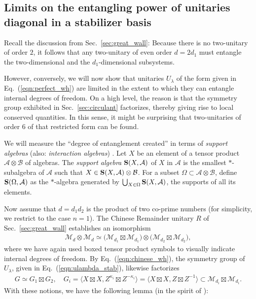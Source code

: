 \documentclass[aps,nofootinbib,floatfix,a4paper]{revtex4}
\newcommand{\1}{\mbox{$\mathbf{1}$}}
\def\Spp{{\bf S}}
\def\A{\mathcal{A}}
\def\B{\mathcal{B}}
\def\M{\mathcal{M}}
\begin{document}
\subsection{Limits on the entangling power of unitaries diagonal in a stabilizer basis}

Recall the discussion from Sec.~\ref{sec:great_wall}:
Because there is no two-unitary of order $2$, 
it follows that any two-unitary of even order $d=2d_1$ must entangle the two-dimensional and the $d_1$-dimensional subsystems.

However, conversely, we will now show that unitaries $U_\lambda$ of the form given in Eq.~(\ref{eqn:perfect_wh})  are limited in the extent to which they can entangle internal degrees of freedom.
On a high level, the reason is that the symmetry group exhibited in Sec.~\ref{sec:circulant} factorizes, thereby giving rise to local conserved quantities.
In this sense, it might be surprising that two-unitaries of order 6 of that restricted form can be found.

We will measure the ``degree of entanglement created'' in terms of \emph{support algebras} 
(also: \emph{interaction algebras})
\cite{zanardi2000stabilizing, gross2012index}.
Let $X$ be an element of a tensor product $\A\otimes \B$ of algebras.
The \emph{support algebra}
$\Spp(X, \A)$ 
of $X$ in $\A$ 
is the smallest 
$*$-subalgebra of $\A$ such that $X \in \Spp(X, \A) \otimes \mathcal{B}$.
For a subset $\Omega\subset \A\otimes \B$, define 
$\Spp(\Omega,\A)$
as the $*$-algebra generated by 
$\bigcup_{X\in\Omega} \Spp(X,\A)$,
the supports
of all its elements.

Now assume that $d=d_1 d_2$ is the product of two co-prime numbers
(for simplicity, we restrict to the case $n=1$).
The Chinese Remainder unitary $R$ of Sec.~\ref{sec:great_wall} establishes an isomorphism
\begin{align*}
	\M_{d}\otimes \M_d \simeq 
	\big(\M_{d_1}\boxtimes \M_{d_1}\big)
	\otimes
	\big(\M_{d_2}\boxtimes \M_{d_2}\big),
\end{align*}
where we have again used boxed tensor product symbols to visually indicate internal degrees of freedom.
By Eq.~(\ref{eqn:chinese_wh}), the 
symmetry group of $U_\lambda$,
given in Eq.~(\ref{eqn:ulambda_stab}), likewise factorizes 
\begin{align*}
	G\simeq G_{1} \boxtimes G_{2},
	\quad
	G_{i} 
	= 
	\langle X\boxtimes X, Z^{\kappa_i} \boxtimes Z^{-\kappa_i} \rangle 
	= 
	\langle X\boxtimes X, Z \boxtimes Z^{-1} \rangle 
	\subset \M_{d_i}\boxtimes \M_{d_i}.
\end{align*}
With these notions, we have the following lemma (in the spirit of \cite[Lemma~7]{gross2012index}):
\end{document}
